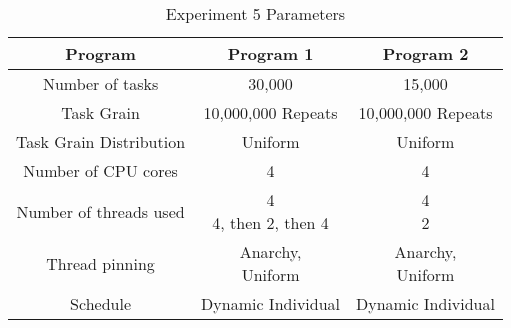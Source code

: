 \begin{table}
\centering
 \begin{tabular}{|c|c|c|}
  \hline
  Program & Program 1 & Program 2 \\
  \hline
  Number of tasks & 30,000 & 15,000 \\
  \hline
  Task Grain & 10,000,000 Repeats & 10,000,000 Repeats \\
  \hline
  Task Grain Distribution & Uniform & Uniform \\
  \hline
  Number of CPU cores & 4 & 4 \\
  \hline
  Number of threads used & \specialcell{4 \\ 4, then 2, then 4} & \specialcell{4 \\ 2} \\
  \hline
  Thread pinning & \specialcell{Anarchy, \\ Uniform} & \specialcell{Anarchy, \\ Uniform} \\
  \hline
  Schedule & Dynamic Individual & Dynamic Individual \\
  \hline
 \end{tabular}
\caption{Experiment 5 Parameters}
\iflabele
\label{table:evaluation_ex5_parameters}
\fi
{}
\end{table}
